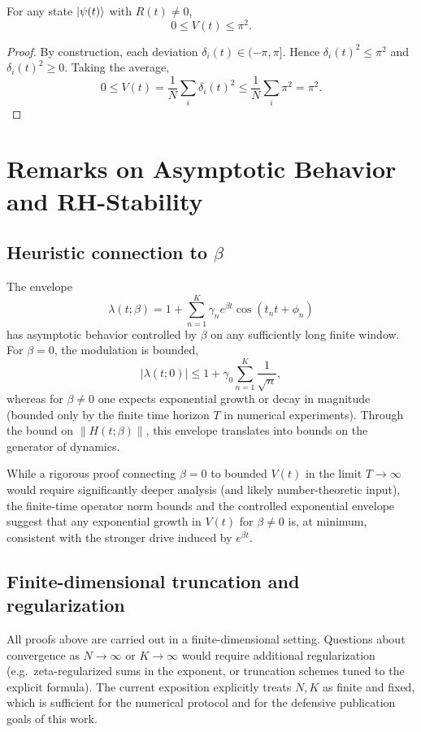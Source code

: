 \documentclass[11pt]{article}
\begin{document}
\begin{lemma}
For any state $\ket{\psi(t)}$ with $R(t)\neq 0$,
\[
0 \le V(t) \le \pi^2.
\]
\end{lemma}

\begin{proof}
By construction, each deviation $\delta_i(t)\in(-\pi,\pi]$. Hence $\delta_i(t)^2\le \pi^2$ and $\delta_i(t)^2\ge 0$. Taking the average,
\[
0 \le V(t) = \frac{1}{N}\sum_i \delta_i(t)^2 \le \frac{1}{N}\sum_i \pi^2 = \pi^2.
\]
\end{proof}

\section{Remarks on Asymptotic Behavior and RH-Stability}

\subsection{Heuristic connection to \texorpdfstring{$\beta$}{beta}}

The envelope
\[
\lambda(t;\beta) = 1 + \sum_{n=1}^K \gamma_n e^{\beta t}\cos(t_n t + \phi_n)
\]
has asymptotic behavior controlled by $\beta$ on any sufficiently long finite window. For $\beta=0$, the modulation is bounded,
\[
|\lambda(t;0)| \le 1 + \gamma_0\sum_{n=1}^K\frac{1}{\sqrt{n}},
\]
whereas for $\beta\neq 0$ one expects exponential growth or decay in magnitude (bounded only by the finite time horizon $T$ in numerical experiments). Through the bound on $\|H(t;\beta)\|$, this envelope translates into bounds on the generator of dynamics.

While a rigorous proof connecting $\beta=0$ to bounded $V(t)$ in the limit $T\to\infty$ would require significantly deeper analysis (and likely number-theoretic input), the finite-time operator norm bounds and the controlled exponential envelope suggest that any exponential growth in $V(t)$ for $\beta\neq 0$ is, at minimum, consistent with the stronger drive induced by $e^{\beta t}$.

\subsection{Finite-dimensional truncation and regularization}

All proofs above are carried out in a finite-dimensional setting. Questions about convergence as $N\to\infty$ or $K\to\infty$ would require additional regularization (e.g.\ zeta-regularized sums in the exponent, or truncation schemes tuned to the explicit formula). The current exposition explicitly treats $N,K$ as finite and fixed, which is sufficient for the numerical protocol and for the defensive publication goals of this work.
\end{document}
